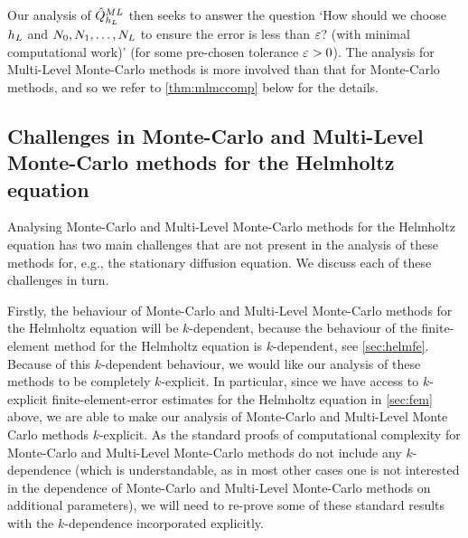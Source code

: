Our analysis of $\hat{Q}^{ML}_{h_{L}}$ then seeks to answer the question `How should we choose $h_{L}$ and $N_{0},N_{1},\ldots,N_{L}$ to ensure the error is less than $\varepsilon$? (with minimal computational work)' (for some pre-chosen tolerance $\varepsilon > 0$). The analysis for Multi-Level Monte-Carlo methods is more involved than that for Monte-Carlo methods, and so we refer to \cref{thm:mlmccomp} below for the details.

\subsection{Challenges in Monte-Carlo and Multi-Level Monte-Carlo methods for the Helmholtz equation}\label{sec:mlmcchallenges}

Analysing Monte-Carlo and Multi-Level Monte-Carlo methods for the Helmholtz equation has two main challenges that are not present in the analysis of these methods for, e.g., the stationary diffusion equation. We discuss each of these challenges in turn.

Firstly, the behaviour of Monte-Carlo and Multi-Level Monte-Carlo methods for the Helmholtz equation will be $k$-dependent, because the behaviour of the finite-element method for the Helmholtz equation is $k$-dependent, see \cref{sec:helmfe}. Because of this $k$-dependent behaviour, we would like our analysis of these methods to be completely $k$-explicit. In particular, since we have access to $k$-explicit finite-element-error estimates for the Helmholtz equation in \cref{sec:fem} above, we are able to make our analysis of Monte-Carlo and Multi-Level Monte Carlo methods $k$-explicit.  As the standard proofs of computational complexity for Monte-Carlo and Multi-Level Monte-Carlo methods do not include any $k$-dependence (which is understandable, as in most other cases one is not interested in the dependence of Monte-Carlo and Multi-Level Monte-Carlo methods on additional parameters), we will need to re-prove some of these standard results with the $k$-dependence incorporated explicitly.

